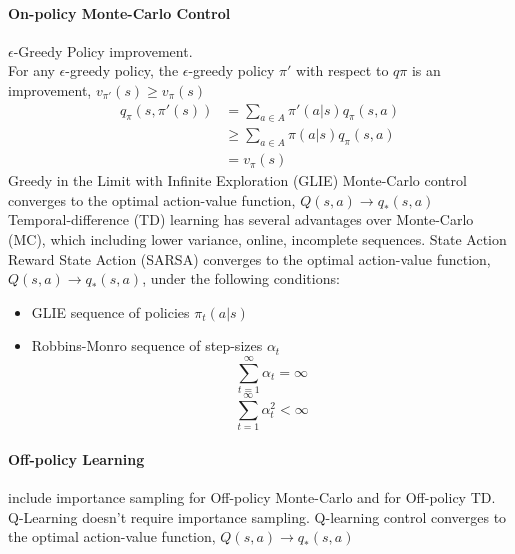 \documentclass[10pt,twocolumn,letterpaper]{article}
\begin{document}
\paragraph{On-policy Monte-Carlo Control} $\epsilon$-Greedy Policy improvement. \\
For any $\epsilon$-greedy policy, the $\epsilon$-greedy policy $\pi '$ with respect to $q\pi$ is an improvement, $v_{\pi '}(s) \geq v_{\pi}(s)$
\begin{equation}
\begin{aligned}
q_\pi (s, \pi '(s))&=\sum_{a \in A} \pi'(a|s) q_\pi (s,a)\\
&\geq \sum_{a \in A} \pi (a|s) q_\pi (s,a)\\
& = v_\pi (s)
\end{aligned}
\end{equation}
Greedy in the Limit with Infinite Exploration (GLIE) Monte-Carlo control converges to the optimal action-value function, $Q(s, a) \rightarrow q_\ast (s, a)$\\
Temporal-difference (TD) learning has several advantages over Monte-Carlo (MC), which including lower variance, online, incomplete sequences. State Action Reward State Action (SARSA) converges to the optimal action-value function, $Q(s, a) \rightarrow q_\ast (s, a)$, under the following conditions:
\begin{itemize}
	\item GLIE sequence of policies $\pi_t (a|s)$
	\item Robbins-Monro sequence of step-sizes $\alpha_t$
	$$\sum_{t=1}^{\infty}\alpha_t = \infty$$
	$$\sum_{t=1}^{\infty}\alpha_t^2 < \infty$$
\end{itemize}
\paragraph{Off-policy Learning} include importance sampling for Off-policy Monte-Carlo and for Off-policy TD. Q-Learning doesn't require importance sampling. Q-learning control converges to the optimal action-value function, $Q(s, a) \rightarrow q_\ast (s, a)$


\end{document}
